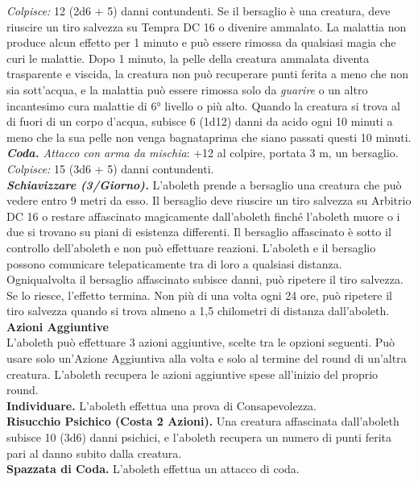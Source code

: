 \begin{multicols}{2}
\emph{Colpisce:} 12 (2d6 + 5) danni contundenti. Se il bersaglio è una creatura, deve riuscire un tiro salvezza su Tempra DC  16 o divenire ammalato. La malattia non produce alcun effetto per 1 minuto e può essere rimossa da qualsiasi magia che curi le malattie. Dopo 1 minuto, la pelle della creatura ammalata diventa trasparente e viscida, la creatura non può recuperare punti ferita a meno che non sia sott'acqua, e la malattia può essere rimossa solo da \emph{guarire} o un altro incantesimo cura malattie di 6° livello o più alto. Quando la creatura si trova al di fuori di un corpo d'acqua, subisce 6 (1d12) danni da acido ogni 10 minuti a meno che la sua pelle non venga bagnataprima che siano  passati questi 10 minuti. \\
\emph{\textbf{Coda.} Attacco con arma da mischia}: +12 al colpire, portata 3 m, un bersaglio.\\
\emph{Colpisce:} 15 (3d6 + 5) danni contundenti.\\
\emph{\textbf{Schiavizzare (3/Giorno).}} L'aboleth prende a bersaglio
una creatura che può vedere entro 9 metri da esso. Il bersaglio deve
riuscire un tiro salvezza su Arbitrio DC  16 o restare affascinato
magicamente dall'aboleth finché l'aboleth muore o i due si trovano su
piani di esistenza differenti. Il bersaglio affascinato è sotto il
controllo dell'aboleth e non può effettuare reazioni. L'aboleth e il
bersaglio possono comunicare telepaticamente tra di loro a qualsiasi
distanza.\\
Ogniqualvolta il bersaglio affascinato subisce danni, può ripetere il
tiro salvezza. Se lo riesce, l'effetto termina. Non più di una volta
ogni 24 ore, può ripetere il tiro salvezza quando si trova almeno a 1,5
chilometri di distanza dall'aboleth.\\
\textbf{Azioni Aggiuntive}\\
L'aboleth può effettuare 3 azioni aggiuntive, scelte tra le opzioni seguenti. Può usare solo un'Azione Aggiuntiva alla volta e solo al termine del round di un'altra creatura. L'aboleth recupera le azioni aggiuntive spese all'inizio del proprio round.\\
\textbf{Individuare.} L'aboleth effettua una prova di Consapevolezza. \\
\textbf{Risucchio Psichico (Costa 2 Azioni).} Una creatura affascinata dall'aboleth subisce 10 (3d6) danni psichici, e l'aboleth recupera un numero di punti ferita pari al danno subito dalla creatura.\\
\textbf{Spazzata di Coda.} L'aboleth effettua un attacco di coda.\\

\end{multicols}

